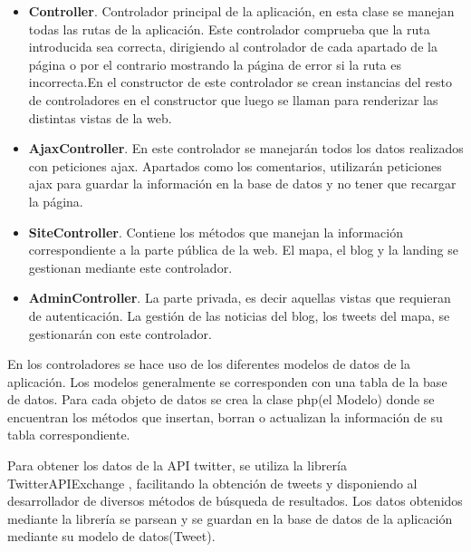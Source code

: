 \begin{itemize}

\item \textbf{Controller}. Controlador principal de la aplicación, en esta clase se manejan todas las rutas de la aplicación. Este controlador comprueba que la ruta introducida sea correcta, dirigiendo al controlador de cada apartado de la página o por el contrario mostrando la página de error si la ruta es incorrecta.En el constructor de este controlador se crean instancias del resto de controladores en el constructor que luego se llaman para renderizar las distintas vistas de la web.

\item \textbf{AjaxController}. En este controlador se manejarán todos los datos realizados con peticiones ajax. Apartados como los comentarios, utilizarán peticiones ajax para guardar la información en la base de datos y no tener que recargar la página.

\item \textbf{SiteController}. Contiene los métodos que manejan la información correspondiente a la parte pública de la web. El mapa, el blog y la landing se gestionan mediante este controlador.

\item \textbf{AdminController}. La parte privada, es decir aquellas vistas que requieran de autenticación. La gestión de las noticias del blog, los tweets del mapa, se gestionarán con este controlador.

\end{itemize}


En los controladores se hace uso de los diferentes modelos de datos de la aplicación. Los modelos generalmente se corresponden con una tabla de la base de datos. Para cada objeto de datos se crea la clase php(el Modelo) donde se encuentran los métodos que insertan, borran o actualizan la información de su tabla correspondiente.

\vspace{5 mm}

Para obtener los datos de la API twitter, se utiliza la librería TwitterAPIExchange \cite{tweet-framework}, facilitando la obtención de tweets y disponiendo al desarrollador de diversos métodos de búsqueda de resultados. Los datos obtenidos mediante la librería se parsean y se guardan en la base de datos de la aplicación mediante su modelo de datos(Tweet).

\vspace{5 mm}

